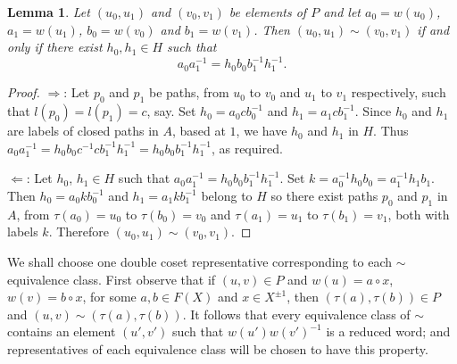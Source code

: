 \documentclass[a4paper,12pt]{article}
\renewcommand{\t}{\tau }
\newtheorem{lemma}[theorem]{Lemma}
\numberwithin{equation}{section}
\numberwithin{figure}{section}
\begin{document}
\begin{lemma}\label{lem:equiv_verts}
Let $(u_0,u_1)$ and $(v_0,v_1)$ be elements of $P$ and let
$a_0=w(u_0)$, $a_1=w(u_1)$, $b_0=w(v_0)$ and $b_1=w(v_1)$. Then
$(u_0,u_1)\sim (v_0,v_1)$ if and only if there exist $h_0,h_1\in H$ such that
\[a_0a_1^{-1}=h_0b_0b_1^{-1}h_1^{-1}.\]
\end{lemma}
\begin{proof}
$\Rightarrow$: Let $p_0$ and $p_1$ be paths, from $u_0$ to $v_0$ and $u_1$ to $v_1$
respectively, such that $l(p_0)=l(p_1)=c$, say. Set $h_0=a_0cb_0^{-1}$ and
$h_1=a_1cb_1^{-1}$. Since $h_0$ and $h_1$ are labels of closed paths in $A$, based at $1$, we
have $h_0$ and $h_1$ in $H$. Thus
$a_0a_1^{-1}=h_0b_0c^{-1}cb_1^{-1}h_1^{-1}=h_0b_0b_1^{-1}h_1^{-1}$, as required.

$\Leftarrow$: Let $h_0$, $h_1 \in H$ such that $a_0a_1^{-1}=h_0b_0b_1^{-1}h_1^{-1}$.
Set $k=a_0^{-1}h_0b_0=a_1^{-1}h_1b_1$. Then $h_0=a_0kb_0^{-1}$ and $h_1=a_1kb_1^{-1}$
belong to $H$ so there exist paths $p_0$ and $p_1$ in $A$,
from $\t(a_0)=u_0$ to $\t(b_0)=v_0$ and
$\t(a_1)=u_1$ to $\t(b_1)=v_1$, both with labels $k$.
Therefore $(u_0,u_1)\sim (v_0,v_1)$.
\end{proof}


We shall choose one double coset representative corresponding to
each $\sim$ equivalence class. First observe that if
$(u,v)\in P$ and $w(u)=a\circ x$, $w(v)=b\circ x$, for some
$a,b\in F(X)$ and $x\in X^{\pm 1}$, then $(\t(a),\t(b))\in P$ and
$(u,v)\sim (\t(a),\t(b))$. It follows that every equivalence  class
of $\sim$ contains an element $(u',v')$ such that
$w(u')w(v')^{-1}$ is a reduced word; and representatives of each
equivalence class will be chosen to have this property. 
\end{document}
